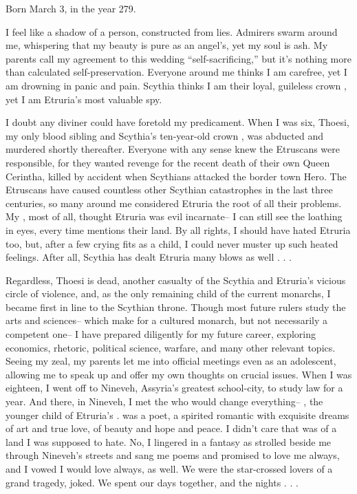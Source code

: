 \documentclass[char]{Kos}
\begin{document}
\name{\cBride{}}

Born March 3, in the year 279.

I feel like a shadow of a person, constructed from lies. Admirers swarm around me, whispering that my beauty is pure as an angel's, yet my soul is ash. My parents call my agreement to this wedding ``self-sacrificing,'' but it's nothing more than calculated self-preservation. Everyone around me thinks I am carefree, yet I am drowning in panic and pain. Scythia thinks I am their loyal, guileless crown \cBride{\prince}, yet I am Etruria's most valuable spy.

I doubt any diviner could have foretold my predicament. When I was six, Thoesi, my only blood sibling and Scythia's ten-year-old crown \cFugitive{\prince}, was abducted and murdered shortly thereafter. Everyone with any sense knew the Etruscans were responsible, for they wanted revenge for the recent death of their own Queen Cerintha, killed by accident when Scythians attacked the border town Hero. The Etruscans have caused countless other Scythian catastrophes in the last three centuries, so many around me considered Etruria the root of all their problems. My \cScythiaQueen{\parent}, most of all, thought Etruria was evil incarnate-- I can still see the loathing in \cScythiaQueen{\their} eyes, every time \cScythiaQueen{\they} mentions their land. By all rights, I should have hated Etruria too, but, after a few crying fits as a child, I could never muster up such heated feelings. After all, Scythia has dealt Etruria many blows as well . . .

Regardless, Thoesi is dead, another casualty of the Scythia and Etruria's vicious circle of violence, and, as the only remaining child of the current monarchs, I became first in line to the Scythian throne. Though most future rulers study the arts and sciences-- which make for a cultured monarch, but not necessarily a competent one-- I have prepared diligently for my future career, exploring economics, rhetoric, political science, warfare, and many other relevant topics. Seeing my zeal, my parents let me into official meetings even as an adolescent, allowing me to speak up and offer my own thoughts on crucial issues. When I was eighteen, I went off to Nineveh, Assyria's greatest school-city, to study law for a year. And there, in Nineveh, I met the \cPoet{\human} who would change everything-- \cPoet{}, the younger child of Etruria's \cEtruriaKing{\monarch}. \cPoet{\They} was a poet, a spirited romantic with exquisite dreams of art and true love, of beauty and hope and peace. I didn't care that \cPoet{\they} was \cPoet{\prince} of a land I was supposed to hate. No, I lingered in a fantasy as \cPoet{\they} strolled beside me through Nineveh's streets and sang me poems and promised to love me always, and I vowed I would love \cPoet{\them} always, as well. We were the star-crossed lovers of a grand tragedy, \cPoet{\they} joked. We spent our days together, and the nights . . .
\end{document}
